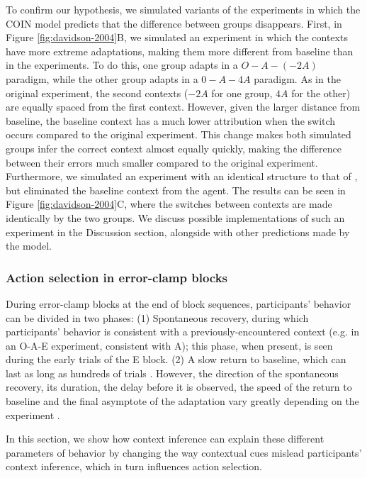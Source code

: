 \documentclass[a4paper,doc,floatsintext,natbib]{apa6}
\def \fref #1{Figure \ref{#1}}     %
\begin{document}
To confirm our hypothesis, we simulated variants of the experiments in which the COIN model predicts that the difference between groups disappears. First, in \fref{fig:davidson-2004}B, we simulated an experiment in which the contexts have more extreme adaptations, making them more different from baseline than in the \cite{Davidson_Scaling_2004} experiments. To do this, one group adapts in a $O-A-(-2A)$ paradigm, while the other group adapts in a $0-A-4A$ paradigm. As in the original experiment, the second contexts ($-2A$ for one group, $4A$ for the other) are equally spaced from the first context. However, given the larger distance from baseline, the baseline context has a much lower attribution when the switch occurs compared to the original experiment. This change makes both simulated groups infer the correct context almost equally quickly, making the difference between their errors much smaller compared to the original experiment. Furthermore, we simulated an experiment with an identical structure to that of \cite{Davidson_Scaling_2004}, but eliminated the baseline context from the agent. The results can be seen in \fref{fig:davidson-2004}C, where the switches between contexts are made identically by the two groups. We discuss possible implementations of such an experiment in the Discussion section, alongside with other predictions made by the model.

\subsubsection{Action selection in error-clamp blocks}
During error-clamp blocks at the end of block sequences, participants' behavior can be divided in two phases: (1) Spontaneous recovery, during which participants' behavior is consistent with a previously-encountered context (e.g. in an O-A-E experiment, consistent with A); this phase, when present, is seen during the early trials of the E block. (2) A slow return to baseline, which can last as long as hundreds of trials \citep{Brennan_Decay_2015}. However, the direction of the spontaneous recovery, its duration, the delay before it is observed, the speed of the return to baseline and the final asymptote of the adaptation vary greatly depending on the experiment \citep{Brennan_Decay_2015,Vaswani_Decay_2013,Smith_Interacting_2006,Shmuelof_Overcoming_2012}.

In this section, we show how context inference can explain these different parameters of behavior by changing the way contextual cues mislead participants' context inference, which in turn influences action selection.
\end{document}
